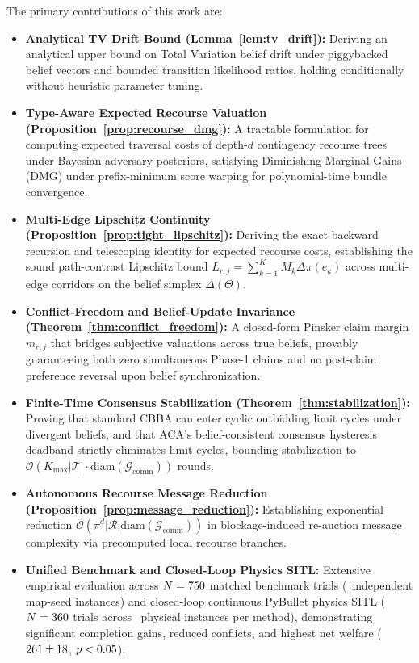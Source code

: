 \documentclass[lettersize,journal]{IEEEtran}
\begin{document}
The primary contributions of this work are:
\begin{itemize}[leftmargin=*,itemsep=1pt,topsep=2pt,parsep=0pt]
    \item \textbf{Analytical TV Drift Bound (Lemma~\ref{lem:tv_drift}):} Deriving an analytical upper bound on Total Variation belief drift under piggybacked belief vectors and bounded transition likelihood ratios, holding conditionally without heuristic parameter tuning.
    \item \textbf{Type-Aware Expected Recourse Valuation (Proposition~\ref{prop:recourse_dmg}):} A tractable formulation for computing expected traversal costs of depth-$d$ contingency recourse trees under Bayesian adversary posteriors, satisfying Diminishing Marginal Gains (DMG) under prefix-minimum score warping for polynomial-time bundle convergence.
    \item \textbf{Multi-Edge Lipschitz Continuity (Proposition~\ref{prop:tight_lipschitz}):} Deriving the exact backward recursion and telescoping identity for expected recourse costs, establishing the sound path-contrast Lipschitz bound $L_{r,j} = \sum_{k=1}^K M_k \Delta\pi(e_k)$ across multi-edge corridors on the belief simplex $\Delta(\Theta)$.
    \item \textbf{Conflict-Freedom and Belief-Update Invariance (Theorem~\ref{thm:conflict_freedom}):} A closed-form Pinsker claim margin $m_{r, j}$ that bridges subjective valuations across true beliefs, provably guaranteeing both zero simultaneous Phase-1 claims and no post-claim preference reversal upon belief synchronization.
    \item \textbf{Finite-Time Consensus Stabilization (Theorem~\ref{thm:stabilization}):} Proving that standard CBBA can enter cyclic outbidding limit cycles under divergent beliefs, and that ACA's belief-consistent consensus hysteresis deadband strictly eliminates limit cycles, bounding stabilization to $\mathcal{O}(K_{\max}|\mathcal{T}| \cdot \mathrm{diam}(\mathcal{G}_{\text{comm}}))$ rounds.
    \item \textbf{Autonomous Recourse Message Reduction (Proposition~\ref{prop:message_reduction}):} Establishing exponential reduction $\mathcal{O}(\bar{\pi}^d |\mathcal{R}| \mathrm{diam}(\mathcal{G}_{\text{comm}}))$ in blockage-induced re-auction message complexity via precomputed local recourse branches.
    \item \textbf{Unified Benchmark and Closed-Loop Physics SITL:} Extensive empirical evaluation across $N = 750$ matched benchmark trials (\aeBenchmarkClusters\ independent map-seed instances) and closed-loop continuous PyBullet physics SITL ($N = 360$ trials across \aeSitlPhysicalInstances\ physical instances per method), demonstrating significant completion gains, reduced conflicts, and highest net welfare ($261 \pm 18$, $p < 0.05$).
\end{itemize}
\end{document}
